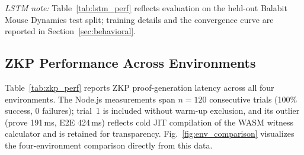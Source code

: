 \documentclass[journal,twoside,10pt]{IEEEtran}
\begin{document}
\textit{LSTM note:} Table~\ref{tab:lstm_perf} reflects evaluation on the
held-out Balabit Mouse Dynamics test split; training details and the
convergence curve are reported in Section~\ref{sec:behavioral}.

\subsection{ZKP Performance Across Environments}

Table~\ref{tab:zkp_perf} reports ZKP proof-generation latency across all
four environments. The Node.js measurements span $n=120$ consecutive
trials (100\% success, 0 failures); trial~1 is included without warm-up
exclusion, and its outlier (prove 191\,ms, E2E 424\,ms) reflects cold JIT
compilation of the WASM witness calculator and is retained for
transparency. Fig.~\ref{fig:env_comparison} visualizes the four-environment
comparison directly from this data.
\end{document}
